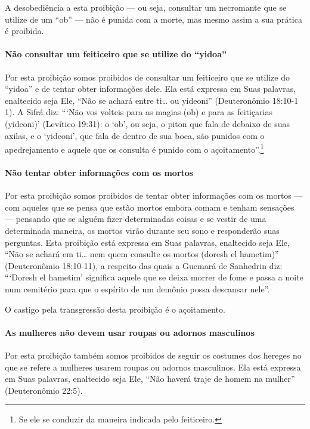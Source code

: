 A desobediência a esta proibição --- ou seja, consultar um necromante
que se utilize de um ``ob'' --- não é punida com a morte, mas mesmo
assim a sua prática é proibida.

\paragraph{Não consultar um feiticeiro que se utilize do ``yidoa''}

Por esta proibição somos proibidos de consultar um feiticeiro que se
utilize do ``yidoa'' e de tentar obter informações dele. Ela está
expressa em Suas palavras, enaltecido seja Ele, ``Não se achará entre
ti\ldots{} ou yideoni'' (Deuteronômio 18:10-1 1). A Sifrá diz: ```Não vos
volteis para as magias (ob) e para as feitiçarias (yideoni)' (Levítico
19:31): o `ob', ou seja, o piton que fala de debaixo de suas axilas, e o
`yideoni', que fala de dentro de sua boca, são punidos com o
apedrejamento e aquele que os consulta é punido com o
açoitamento''.\footnote{Se ele se conduzir da maneira indicada pelo feiticeiro.}

\paragraph{Não tentar obter informações com os mortos}

Por esta proibição somos proibidos de tentar obter informações com os
mortos --- com aqueles que se pensa que estão mortos embora comam e
tenham sensações --- pensando que se alguém fizer determinadas coisas e
se vestir de uma determinada maneira, os mortos virão durante seu sono e
responderão suas perguntas. Esta proibição está expressa em Suas
palavras, enaltecido seja Ele, ``Não se achará em ti\ldots{} nem quem
consulte os mortos (doresh el hametim)'' (Deuteronômio 18:10-11), a
respeito das quais a Guemará de Sanhedrin diz: ```Doresh el hametim'
significa aquele que se deixa morrer de fome e passa a noite num
cemitério para que o espírito de um demônio possa descansar nele''.

O castigo pela transgressão desta proibição é o açoitamento.

\paragraph{As mulheres não devem usar roupas ou adornos masculinos}

Por esta proibição também somos proibidos de seguir os costumes dos
hereges no que se refere a mulheres usarem roupas ou adornos masculinos.
Ela está expressa em Suas palavras, enaltecido seja Ele, ``Não haverá
traje de homem na mulher'' (Deuteronômio 22:5).

